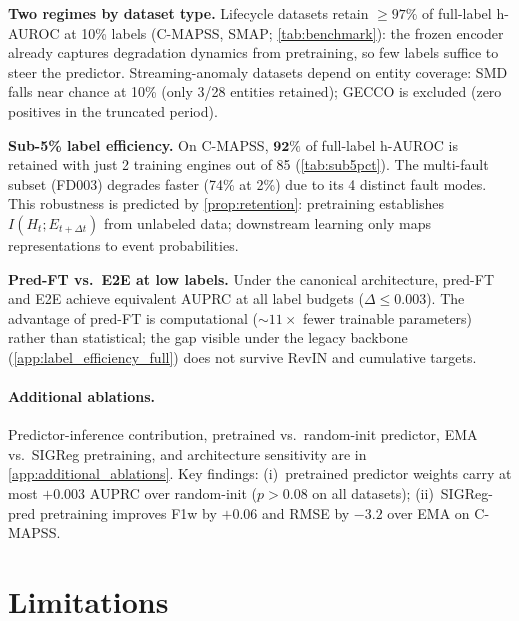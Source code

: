 \documentclass{article}
\begin{document}
\textbf{Two regimes by dataset type.} Lifecycle datasets retain ${\geq}97\%$ of full-label h-AUROC at 10\% labels (C-MAPSS, SMAP; \cref{tab:benchmark}): the frozen encoder already captures degradation dynamics from pretraining, so few labels suffice to steer the predictor. Streaming-anomaly datasets depend on entity coverage: SMD falls near chance at 10\% (only 3/28 entities retained); GECCO is excluded (zero positives in the truncated period).

\textbf{Sub-5\% label efficiency.} On C-MAPSS, $\mathbf{92\%}$ of full-label h-AUROC is retained with just 2 training engines out of 85 (\cref{tab:sub5pct}). The multi-fault subset (FD003) degrades faster (74\% at 2\%) due to its 4 distinct fault modes. This robustness is predicted by \cref{prop:retention}: pretraining establishes $I(H_t; E_{t+\Delta t})$ from unlabeled data; downstream learning only maps representations to event probabilities.

\textbf{Pred-FT vs.\ E2E at low labels.} Under the canonical architecture, pred-FT and E2E achieve equivalent AUPRC at all label budgets ($\Delta \leq 0.003$). The advantage of pred-FT is computational (${\sim}11{\times}$ fewer trainable parameters) rather than statistical; the gap visible under the legacy backbone (\cref{app:label_efficiency_full}) does not survive RevIN and cumulative targets.

\paragraph{Additional ablations.} Predictor-inference contribution, pretrained vs.\ random-init predictor, EMA vs.\ SIGReg pretraining, and architecture sensitivity are in \cref{app:additional_ablations}. Key findings: (i)~pretrained predictor weights carry at most $+0.003$ AUPRC over random-init ($p > 0.08$ on all datasets); (ii)~SIGReg-pred pretraining improves F1w by $+0.06$ and RMSE by $-3.2$ over EMA on C-MAPSS.

\section{Limitations}
\label{sec:limitations}
\end{document}
